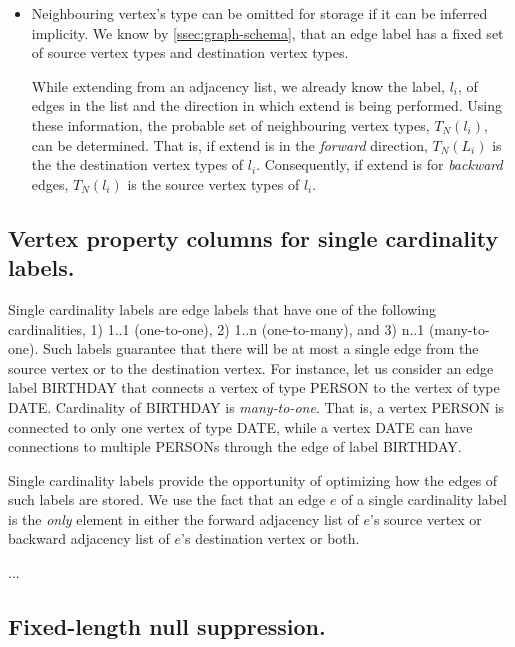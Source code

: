 \begin{itemize}
	\item Neighbouring vertex's type can be omitted for storage if it can be inferred implicity. We know by \ref{ssec:graph-schema}, that an edge label has a fixed set of source vertex types and destination vertex types. 
	
	While extending from an adjacency list, we already know the label, $l_i$, of edges in the list and the direction in which extend is being performed. Using these information, the probable set of neighbouring vertex types, $T_N(l_i)$, can be determined. That is, if extend is in the \emph{forward} direction, $T_N(L_i)$ is the the destination vertex types of $l_i$. Consequently, if extend is for \emph{backward} edges, $T_N(l_i)$ is the source vertex types of $l_i$. 
\end{itemize}

\subsection{Vertex property columns for single cardinality labels.}

Single cardinality labels are edge labels that have one of the following cardinalities, 1) 1..1 (one-to-one), 2) 1..n (one-to-many), and 3) n..1 (many-to-one). Such labels guarantee that there will be at most a single edge from the source vertex or to the destination vertex. For instance, let us consider an edge label BIRTHDAY that connects a vertex of type PERSON to the vertex of type DATE. Cardinality of BIRTHDAY is \emph{many-to-one}. That is, a vertex PERSON is connected to only one vertex of type DATE, while a vertex DATE can have connections to multiple PERSONs through the edge of label BIRTHDAY.

Single cardinality labels provide the opportunity of optimizing how the edges of such labels are stored. We use the fact that an edge $e$ of a single cardinality label is the \emph{only} element in either the forward adjacency list of $e$'s source vertex or backward adjacency list of $e$'s destination vertex or both. 

...

\subsection{Fixed-length null suppression.}
